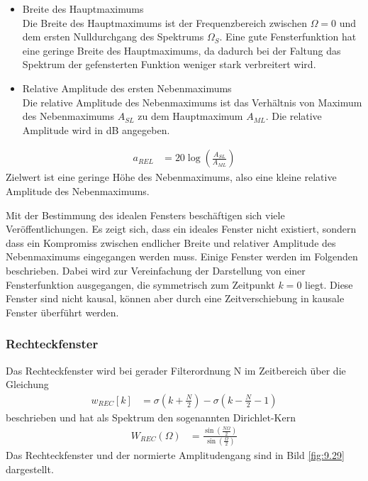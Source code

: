 \begin{itemize}
\item
  Breite des Hauptmaximums\\
  Die Breite des Hauptmaximums ist der Frequenzbereich zwischen \(Ω = 0\) und dem ersten Nulldurchgang des Spektrums \(Ω_{S}\). Eine gute Fensterfunktion hat eine geringe Breite des Hauptmaximums, da dadurch bei der Faltung das Spektrum der gefensterten Funktion weniger stark verbreitert wird.
\item
  Relative Amplitude des ersten Nebenmaximums\\
  Die relative Amplitude des Nebenmaximums ist das Verhältnis von Maximum des Nebenmaximums \(A_{SL}\) zu dem Hauptmaximum \(A_{ML}\). Die relative Amplitude wird in dB angegeben.
\end{itemize}
\begin{align}
a_{REL} &= 20  \log\left( \frac{A_{SL}}{A_{ML}} \right) \label{eq:9.126}
\end{align}
Zielwert ist eine geringe Höhe des Nebenmaximums, also eine kleine relative Amplitude des Nebenmaximums.

Mit der Bestimmung des idealen Fensters beschäftigen sich viele Veröffentlichungen. Es zeigt sich, dass ein ideales Fenster nicht existiert, sondern dass ein Kompromiss zwischen endlicher Breite und relativer Amplitude des Nebenmaximums eingegangen werden muss. Einige Fenster werden im Folgenden beschrieben. Dabei wird zur Vereinfachung der Darstellung von einer Fensterfunktion ausgegangen, die symmetrisch zum Zeitpunkt \(k = 0\) liegt. Diese Fenster sind nicht kausal, können aber durch eine Zeitverschiebung in kausale Fenster überführt werden.

\subsubsection{Rechteckfenster}\label{sec:rechteckfenster}

Das Rechteckfenster wird bei gerader Filterordnung N im Zeitbereich über die Gleichung
\begin{align}
w_{REC}[ k] &= \sigma\left( k + \frac{N}{2} \right) - \sigma\left( k - \frac{N}{2} - 1 \right) \label{eq:9.127}
\end{align}
beschrieben und hat als Spektrum den sogenannten Dirichlet-Kern
\begin{align}
W_{REC}(\Omega) &= \frac{\sin\left( \frac{N  \Omega}{2} \right)}{\sin\left( \frac{\Omega}{2} \right)} \label{eq:9.128}
\end{align}
Das Rechteckfenster und der normierte Amplitudengang sind in Bild \ref{fig:9.29} dargestellt.

